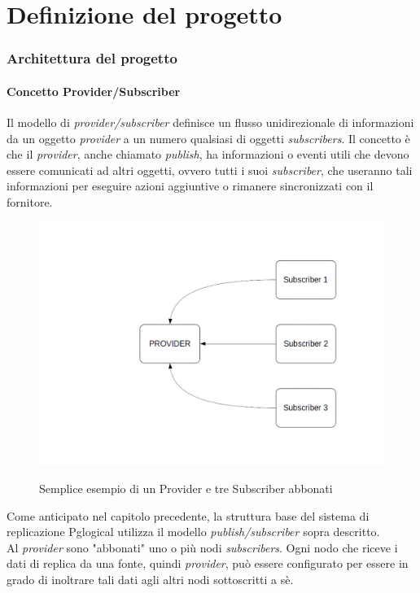 \chapter{Definizione del progetto}
\setcounter{section}{1}
\item
\subsection{Architettura del progetto}
\subsubsection{Concetto Provider/Subscriber}
Il modello di \textit{provider/subscriber} definisce un flusso unidirezionale di informazioni da un oggetto \textit{provider} a un numero qualsiasi di oggetti \textit{subscribers}. Il concetto \`{e} che il \textit{provider}, anche chiamato \textit{publish}, ha informazioni o eventi utili che devono essere comunicati ad altri oggetti, ovvero tutti i suoi \textit{subscriber}, che useranno tali informazioni per eseguire azioni aggiuntive o rimanere sincronizzati con il fornitore. 
\begin{figure}[htbp]
\centering
\includegraphics[scale=0.40]{img/pubsub_1.png}\\
\caption{Semplice esempio di un Provider e tre Subscriber abbonati \label{figura1.14}}
\end{figure}
Come anticipato nel capitolo precedente, la struttura base del sistema di replicazione Pglogical utilizza il modello \textit{publish/subscriber} sopra descritto.\\
Al \textit{provider} sono "abbonati" uno o pi\`{u} nodi \textit{subscribers}. Ogni nodo che riceve i dati di replica da una fonte, quindi \textit{provider}, pu\`{o} essere configurato per essere in grado di inoltrare tali dati agli altri nodi sottoscritti a s\`{e}.\\
